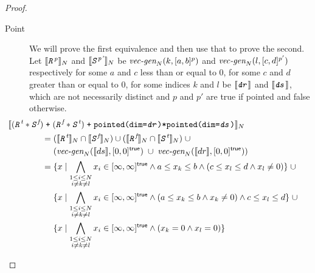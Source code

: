 \documentclass{article}
\theoremstyle{definition}
\theoremstyle{plain}
\theoremstyle{remark}
\newcommand{\interp}[1]{\llbracket{} {#1} \rrbracket{}}
\newcommand{\interv}[3]{\textnormal{$\lbrack#1,#2\rbrack^{#3}$}}
\newcommand{\vecgen}[3]{\textnormal{$\textit{vec-gen}_{#1}(#2,#3)$}}
\newcommand{\textcap}[1]{\texttt{\textit{#1}}}
\begin{document}
\begin{proof}
\begin{description}
    \item[Point] We will prove the first equivalence and then use that to prove
      the second.
%
      Let $\interp{\textcap{R}^{\textnormal{\textit{p}}}}_N$ and
      $\interp{\textcap{S}^{\textnormal{\textit{p'}}}}_N$ be
      $\vecgen{N}{k}{\interv{a}{b}{p}}$ and $\vecgen{N}{l}{\interv{c}{d}{p'}}$
      respectively for some $a$ and $c$ less than or equal to 0, for some $c$
      and $d$ greater than or equal to 0, for some indices $k$ and $l$ be
      $\interp{\textcap{dr}}$ and $\interp{\textcap{ds}}$, which are not
      necessarily distinct and $p$ and $p'$ are \textsf{true} if pointed and
      \textsf{false} otherwise.
%
      \begin{align*}
        \hspace{2em&\hspace{-2em}}
        \interp
          {{(\textcap{R}^{\textit{t}} * \textcap{S}^{\textit{f}})}
           \;\texttt{+}\;
           {(\textcap{R}^{\textit{f}} * \textcap{S}^{\textit{t}})}
           \;\texttt{+}\;
           \texttt{pointed(dim=\textcap{dr})*pointed(dim=\textcap{ds})}}_N \\
        & = {(\interp{\textcap{R}^{\textit{t}}}_N \cap
              \interp{\textcap{S}^{\textit{f}}}_N)} \cup
            {(\interp{\textcap{R}^{\textit{f}}}_N \cap
              \interp{\textcap{S}^{\textit{t}}}_N)} \;\cup \\
        & \quad\,\, {(\vecgen{N}{\interp{ds}}{\interv{0}{0}{\textsf{true}}}
                      \;\cup\;
                      \vecgen{N}{\interp{dr}}{\interv{0}{0}{\textsf{true}}})} \\
        & = \{ x \mid
            \bigwedge_{\substack{1 \leq i \leq N \\ i \neq k \neq l}} x_i \in
              \interv{\infty}{\infty}{\textsf{true}}
            \wedge a \leq x_k \leq b
            \wedge {(c \leq x_l \leq d \wedge x_l \neq 0)} \} \;\cup \\
        & \quad\,\, \{ x \mid
            \bigwedge_{\substack{1 \leq i \leq N \\ i \neq k \neq l}} x_i \in
              \interv{\infty}{\infty}{\textsf{true}}
            \wedge {(a \leq x_k \leq b \wedge x_k \neq 0)}
            \wedge c \leq x_l \leq d \} \;\cup \\
        & \quad\,\, \{ x \mid
            \bigwedge_{\substack{1 \leq i \leq N \\ i \neq k \neq l}} x_i \in
              \interv{\infty}{\infty}{\textsf{true}}
            \wedge (x_k = 0 \wedge x_l = 0) \} \\

\end{align*}
\end{description}
\end{proof}
\end{document}

